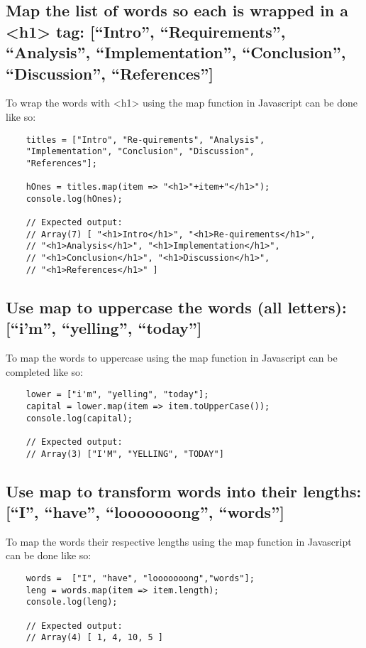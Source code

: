 \documentclass{article}
\begin{document}
\subsection{Map the list of words so each is wrapped in a <h1> tag: [“Intro”, “Requirements”, “Analysis”, “Implementation”, “Conclusion”, “Discussion”, “References”]}
To wrap the words with <h1> using the map function in Javascript can be done like so:
\begin{lstlisting}
    titles = ["Intro", "Re-quirements", "Analysis", 
    "Implementation", "Conclusion", "Discussion",
    "References"];

    hOnes = titles.map(item => "<h1>"+item+"</h1>");
    console.log(hOnes);

    // Expected output:
    // Array(7) [ "<h1>Intro</h1>", "<h1>Re-quirements</h1>", 
    // "<h1>Analysis</h1>", "<h1>Implementation</h1>", 
    // "<h1>Conclusion</h1>", "<h1>Discussion</h1>", 
    // "<h1>References</h1>" ]

\end{lstlisting}

\subsection{Use map to uppercase the words (all letters): [“i’m”, “yelling”, “today”]}
To map the words to uppercase using the map function in Javascript can be completed like so:
\begin{lstlisting}
    lower = ["i'm", "yelling", "today"];
    capital = lower.map(item => item.toUpperCase());
    console.log(capital);

    // Expected output:
    // Array(3) ["I'M", "YELLING", "TODAY"]

\end{lstlisting}

\subsection{Use map to transform words into their lengths: [“I”, “have”, “looooooong”, “words”]}
To map the words their respective lengths using the map function in Javascript can be done like so:
\begin{lstlisting}
    words =  ["I", "have", "looooooong","words"];
    leng = words.map(item => item.length);
    console.log(leng);

    // Expected output:
    // Array(4) [ 1, 4, 10, 5 ]

\end{lstlisting}
\end{document}
